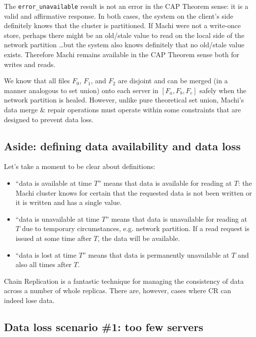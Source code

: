 \documentclass[preprint,10pt]{sigplanconf}
\begin{document}
The {\tt error\_unavailable} result is not an error in the CAP Theorem
sense: it is a valid and affirmative response.  In both cases, the
system on the client's side definitely knows that the cluster is
partitioned.  If Machi were not a write-once store, perhaps there
might be an old/stale value to read on the local side of the network
partition \ldots but the system also knows definitely that no
old/stale value exists.  Therefore Machi remains available in the
CAP Theorem sense both for writes and reads.

We know that all files $F_0$,
$F_1$, and $F_2$ are disjoint and can be merged (in a manner analogous
to set union) onto each server in $[F_a, F_b, F_c]$ safely
when the network partition is healed.  However,
unlike pure theoretical set union, Machi's data merge \& repair
operations must operate within some constraints that are designed to
prevent data loss.

\subsection{Aside: defining data availability and data loss}
\label{sub:define-availability}

Let's take a moment to be clear about definitions:

\begin{itemize}
\item ``data is available at time $T$'' means that data is available
  for reading at $T$: the Machi cluster knows for certain that the
  requested data is not been written or it is written and has a single
  value.
\item ``data is unavailable at time $T$'' means that data is
  unavailable for reading at $T$ due to temporary circumstances,
  e.g. network partition.  If a read request is issued at some time
  after $T$, the data will be available.
\item ``data is lost at time $T$'' means that data is permanently
  unavailable at $T$ and also all times after $T$.
\end{itemize}

Chain Replication is a fantastic technique for managing the
consistency of data across a number of whole replicas.  There are,
however, cases where CR can indeed lose data.  

\subsection{Data loss scenario \#1: too few servers}
\label{sub:data-loss1}
\end{document}
